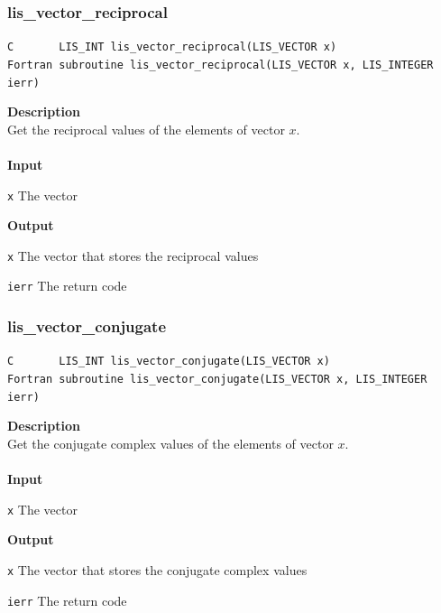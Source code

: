 \documentclass[a4paper]{article}
\newcommand{\namelistlabel}[1]{\mbox{#1}\hfill}
\newenvironment{namelist}[1]{%
\begin{list}{}
  {\let\makelabel\namelistlabel
  \settowidth{\labelwidth}{#1}
  \setlength{\leftmargin}{1.1\labelwidth}}
  }{%
\end{list}}
\begin{document}
\newpage
\subsubsection{lis\_vector\_reciprocal}
\begin{screen}
\verb|C       LIS_INT lis_vector_reciprocal(LIS_VECTOR x)|\\
\verb|Fortran subroutine lis_vector_reciprocal(LIS_VECTOR x, LIS_INTEGER ierr)|
\end{screen}
{\bf Description}\\
\indent
Get the reciprocal values of the elements of vector $x$.
\\ \\
\noindent
{\bf Input}
\begin{namelist}{XXXXXXXXXXXXXXXXXXXX}
\item[\tt x] The vector
\end{namelist}
{\bf Output}
\begin{namelist}{XXXXXXXXXXXXXXXXXXXX}
\item[\tt x] The vector that stores the reciprocal values
\item[\tt ierr] The return code
\end{namelist}

\subsubsection{lis\_vector\_conjugate}
\begin{screen}
\verb|C       LIS_INT lis_vector_conjugate(LIS_VECTOR x)|\\
\verb|Fortran subroutine lis_vector_conjugate(LIS_VECTOR x, LIS_INTEGER ierr)|
\end{screen}
{\bf Description}\\
\indent
Get the conjugate complex values of the elements of vector $x$.
\\ \\
\noindent
{\bf Input}
\begin{namelist}{XXXXXXXXXXXXXXXXXXXX}
\item[\tt x] The vector
\end{namelist}
{\bf Output}
\begin{namelist}{XXXXXXXXXXXXXXXXXXXX}
\item[\tt x] The vector that stores the conjugate complex values
\item[\tt ierr] The return code
\end{namelist}

\newpage
\end{document}
